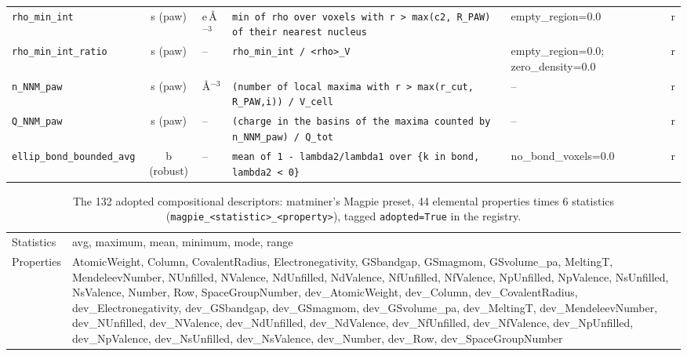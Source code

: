 \begin{table}[p]
\begin{tabular}{p{3.3cm}cp{1.4cm}p{6.6cm}p{2.3cm}c}
\texttt{rho\_min\_int} & s (paw) & e\,\AA$^{-3}$ & \texttt{min of rho over voxels with r > max(c2, R\_PAW) of their nearest nucleus} & empty\_region=0.0 & r \\
\texttt{rho\_min\_int\_ratio} & s (paw) & -- & \texttt{rho\_min\_int / <rho>\_V} & empty\_region=0.0; zero\_density=0.0 & r \\
\texttt{n\_NNM\_paw} & s (paw) & \AA$^{-3}$ & \texttt{(number of local maxima with r > max(r\_cut, R\_PAW,i)) / V\_cell} & -- & r \\
\texttt{Q\_NNM\_paw} & s (paw) & -- & \texttt{(charge in the basins of the maxima counted by n\_NNM\_paw) / Q\_tot} & -- & r \\
\texttt{ellip\_bond\_bounded\_avg} & b (robust) & -- & \texttt{mean of 1 - lambda2/lambda1 over \{k in bond, lambda2 < 0\}} & no\_bond\_voxels=0.0 & r \\
\bottomrule
\end{tabular}
\end{table}

\begin{table}[htbp]
\centering
\caption{The 132 adopted compositional descriptors: matminer's Magpie preset, 44 elemental properties times 6 statistics (\texttt{magpie\_<statistic>\_<property>}), tagged \texttt{adopted=True} in the registry.}
\label{tab:si-magpie}
\small
\begin{tabular}{p{3cm}p{11cm}}
\toprule
Statistics & avg, maximum, mean, minimum, mode, range \\
Properties & AtomicWeight, Column, CovalentRadius, Electronegativity, GSbandgap, GSmagmom, GSvolume\_pa, MeltingT, MendeleevNumber, NUnfilled, NValence, NdUnfilled, NdValence, NfUnfilled, NfValence, NpUnfilled, NpValence, NsUnfilled, NsValence, Number, Row, SpaceGroupNumber, dev\_AtomicWeight, dev\_Column, dev\_CovalentRadius, dev\_Electronegativity, dev\_GSbandgap, dev\_GSmagmom, dev\_GSvolume\_pa, dev\_MeltingT, dev\_MendeleevNumber, dev\_NUnfilled, dev\_NValence, dev\_NdUnfilled, dev\_NdValence, dev\_NfUnfilled, dev\_NfValence, dev\_NpUnfilled, dev\_NpValence, dev\_NsUnfilled, dev\_NsValence, dev\_Number, dev\_Row, dev\_SpaceGroupNumber \\
\bottomrule
\end{tabular}
\end{table}
